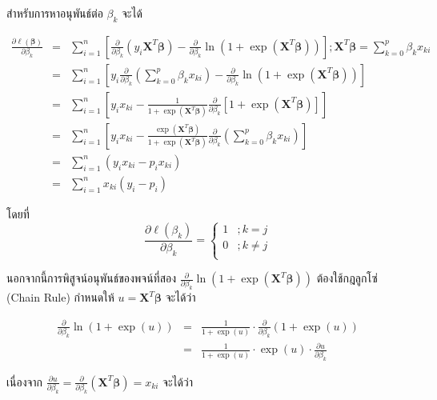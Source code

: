 สำหรับการหาอนุพันธ์ต่อ $\beta_k$ จะได้ 

\begin{eqnarray} \nonumber
	\frac{\partial \ell(\boldsymbol{\beta})}{\partial \beta_k}
	&=& \sum_{i=1}^{n} \left[\frac{\partial}{\partial \beta_k}(y_i \mathbf{X}^{T} \boldsymbol{\beta}) - \frac{\partial}{\partial \beta_k} \ln(1 + \exp(\mathbf{X}^{T} \boldsymbol{\beta}))\right] ; \mathbf{X}^{T} \boldsymbol{\beta} = \sum_{k=0}^{p} \beta_k x_{ki}  \\ \nonumber
	&=& \sum_{i=1}^{n} \left[ y_i \frac{\partial}{\partial \beta_k}\left(\sum_{k=0}^{p} \beta_k x_{ki}\right) - \frac{\partial}{\partial \beta_k} \ln(1 + \exp(\mathbf{X}^{T} \boldsymbol{\beta})) \right]  \\ \nonumber
	&=&  \sum_{i=1}^{n} \left[ y_i x_{ki} - \frac{1}{1 + \exp(\mathbf{X}^{T} \boldsymbol{\beta})}\frac{\partial}{\partial \beta_k} [1 + \exp(\mathbf{X}^{T} \boldsymbol{\beta})]\right] \\ \nonumber
	&=&  \sum_{i=1}^{n} \left[ y_i x_{ki} - \frac{\exp(\mathbf{X}^{T} \boldsymbol{\beta})}{1 + \exp(\mathbf{X}^{T} \boldsymbol{\beta})}\frac{\partial}{\partial \beta_k}\left(\sum_{k=0}^{p} \beta_k x_{ki}\right)\right] \\ \nonumber
	&=&  \sum_{i=1}^{n} (y_i x_{ki} - p_i x_{ki})  \\ \nonumber  
	&=& \sum_{i=1}^{n} x_{ki}(y_i - p_i)
\end{eqnarray}

\noindent
โดยที่ 
$$\frac{\partial \ell(\beta_k)}{\partial \beta_k} = \left\{\begin{matrix}
	1 &;   k=j\\
	0 &;   k\neq j  \\
\end{matrix}\right. $$

\noindent
นอกจากนี้การพิสูจน์อนุพันธ์ของพจน์ที่สอง $\frac{\partial}{\partial \beta_k} \ln(1 + \exp(\mathbf{X}^{T} \boldsymbol{\beta}))$ ต้องใช้กฎลูกโซ่ (Chain Rule) กำหนดให้ $u = \mathbf{X}^{T} \boldsymbol{\beta}$ จะได้ว่า 

\begin{eqnarray} \nonumber
	\frac{\partial}{\partial \beta_k} \ln(1 + \exp(u)) &=& \frac{1}{1 + \exp(u)} \cdot \frac{\partial}{\partial \beta_k}(1 + \exp(u)) \\ \nonumber
	&=& \frac{1}{1 + \exp(u)} \cdot \exp(u) \cdot \frac{\partial u}{\partial \beta_k}
\end{eqnarray}

\noindent
เนื่องจาก $\frac{\partial u}{\partial \beta_k} = \frac{\partial}{\partial \beta_k}(\mathbf{X}^{T} \boldsymbol{\beta}) = x_{ki}$ จะได้ว่า

